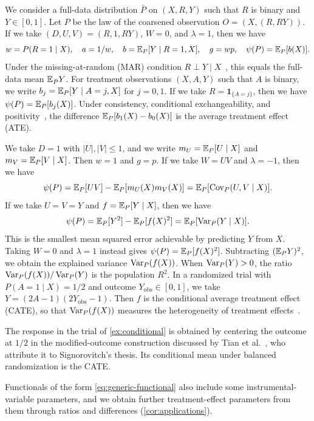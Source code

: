 \begin{example}\label{ex:mar}
We consider a full-data distribution $\bar P$ on $(X,R,Y)$ such that
$R$ is binary and $Y\in[0,1]$. Let $P$ be the law of the coarsened
observation $O=(X,(R,RY))$. If we take $(D,U,V)=(R,1,RY)$, $W=0$, and
$\lambda=1$, then we have
\[
 w=P(R=1\mid X),\quad
 a=1/w,\quad b=\mathbb E_P[Y\mid R=1,X],\quad g=wp,\quad \psi(P)=\mathbb E_P[b(X)].
\]
Under the missing-at-random (MAR) condition
$R\perp Y\mid X$~\cite{rubin}, this equals the full-data mean
$\mathbb E_{\bar P}Y$.
For treatment observations $(X,A,Y)$ such that $A$ is binary,
we write $b_j=\mathbb E_P[Y\mid A=j,X]$ for $j=0,1$.
If we take $R=\mathbf1_{\{A=j\}}$, then we have $\psi(P)=\mathbb E_P[b_j(X)]$.
Under consistency, conditional exchangeability, and
positivity~\cite{hernanrobins}, the difference
$\mathbb E_P[b_1(X)-b_0(X)]$ is the average treatment effect (ATE).
\end{example}

\begin{example}\label{ex:conditional}
We take $D=1$ with $|U|,|V|\le1$, and we write
$m_U=\mathbb E_P[U\mid X]$ and $m_V=\mathbb E_P[V\mid X]$. Then $w=1$ and $g=p$.
If we take $W=UV$ and $\lambda=-1$, then we have
\[
 \psi(P)=\mathbb E_P[UV]-\mathbb E_P[m_U(X)m_V(X)]
        =\mathbb E_P[\operatorname{Cov}_P(U,V\mid X)].
\]
If we take $U=V=Y$ and $f=\mathbb E_P[Y\mid X]$, then we have
\[
 \psi(P)=\mathbb E_P[Y^2]-\mathbb E_P[f(X)^2]=\mathbb E_P[\operatorname{Var}_P(Y\mid X)].
\]
This is the smallest mean squared error achievable by predicting $Y$
from $X$.
Taking $W=0$ and $\lambda=1$ instead gives $\psi(P)=\mathbb E_P[f(X)^2]$.
Subtracting $(\mathbb E_PY)^2$, we obtain the explained variance
$\operatorname{Var}_P(f(X))$. When $\operatorname{Var}_P(Y)>0$, the ratio
$\operatorname{Var}_P(f(X))/\operatorname{Var}_P(Y)$ is the population $R^2$.
In a randomized trial with $P(A=1\mid X)=1/2$ and outcome
$Y_{\mathrm{obs}}\in[0,1]$, we take
$Y=(2A-1)(2Y_{\mathrm{obs}}-1)$. Then $f$ is
the conditional average treatment effect (CATE), so that $\operatorname{Var}_P(f(X))$
measures the heterogeneity of treatment effects~\cite{levy}.
\end{example}

The response in the trial of \cref{ex:conditional} is obtained by
centering the outcome at $1/2$ in the modified-outcome construction
discussed by Tian et al.~\cite[Section~2.1]{tian2014}, who attribute it
to Signorovitch's thesis. Its conditional mean under balanced
randomization is the CATE.

Functionals of the form \eqref{eq:generic-functional} also include some
instrumental-variable parameters, and we obtain further treatment-effect
parameters from them through ratios and differences
(\cref{cor:applications}).

